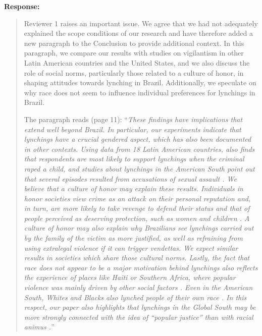 \documentclass[a4paper,12pt]{article}
\begin{document}
\noindent \textbf{Response:} 

\begin{quote}
 
Reviewer 1 raises an important issue. We agree that we had not adequately
explained the scope conditions of our research and have therefore added a new
paragraph to the Conclusion to provide additional context. In this paragraph,
we compare our results with studies on vigilantism in other Latin American
countries and the United States, and we also discuss the role of social norms,
particularly those related to a culture of honor, in shaping attitudes towards
lynching in Brazil. Additionally, we speculate on why race does not seem to
influence individual preferences for lynchings in Brazil.

The paragraph reads (page 11): ``\textit{These findings have implications that
  extend well beyond Brazil. In particular, our experiments indicate that
  lynchings have a crucial gendered aspect, which has also been documented in
  other contexts. Using data from 18 Latin American countries,
  \citet{nivette2016institutional} also finds that respondents are most likely
  to support lynchings when the criminal raped a child, and studies about
  lynchings in the American South point out that several episodes resulted from
  accusations of sexual assault \citep{jacquet2013giles, smaangs2020race}. We
  believe that a culture of honor may explain these results. Individuals in
  honor societies view crime as an attack on their personal reputation and, in
  turn, are more likely to take revenge to defend their status and that of
  people perceived as deserving protection, such as women and children
  \citep{nisbett2018culture}. A culture of honor may also explain why
  Brazilians see lynchings carried out by the family of the victim as more
  justified, as well as refraining from using extralegal violence if it can
  trigger vendettas. We expect similar results in societies which share those
  cultural norms. Lastly, the fact that race does not appear to be a major
  motivation behind lynchings also reflects the experience of places like Haiti
  or Southern Africa, where popular violence was mainly driven by other social
  factors \citep{berg2011globalizing, jung2020lynching}. Even in the American
  South, Whites and Blacks also lynched people of their own race
  \citep{beck1997race}. In this respect, our paper also highlights that
lynchings in the Global South may be more strongly connected with the idea of
``popular justice'' than with racial animus \citep{martins2015linchamentos}.}''


\end{quote}
\end{document}
